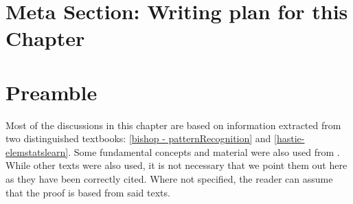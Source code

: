 \section{Meta Section: Writing plan for this Chapter}

\section{Preamble}\label{section-preamble}
Most of the discussions in this chapter are based on information extracted from two distinguished textbooks: \ref{bishop - patternRecognition} and  \ref{hastie-elemstatslearn}. Some fundamental concepts and material were also used from \label{scikit-learn}. While other texts were also used, it is not necessary that we point them out here as they have been correctly cited. Where not specified, the reader can assume that the proof is based from said texts.